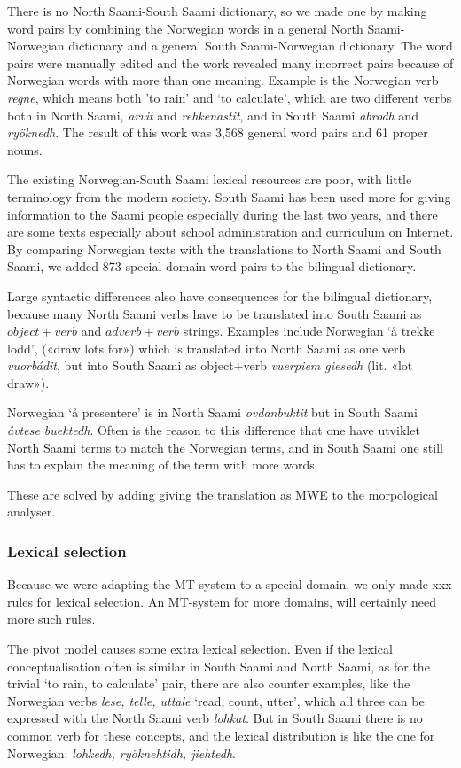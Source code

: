 \documentclass[a4paper,11pt,twocolumn]{article}
\begin{document}
There is no North Saami-South Saami dictionary, so we made one by making word pairs by combining the Norwegian words in a general North Saami-Norwegian dictionary and a general South Saami-Norwegian dictionary. The word pairs were manually edited and the work revealed many incorrect pairs because of Norwegian words with more than one meaning. Example is the Norwegian verb \textit{regne}, which means both 'to rain' and ‘to calculate’, which are two different verbs both in North Saami, \textit{arvit} and \textit{rehkenastit}, and in South Saami \textit{abrodh} and \textit{ryöknedh}. The result of this work was 3,568 general word pairs and 61 proper nouns.

The existing Norwegian-South Saami lexical resources are poor, with little terminology from the modern society. South Saami has been used more for giving information to the Saami people especially during the last two years, and there are some texts especially about school administration and curriculum on Internet. By comparing Norwegian texts with the translations to North Saami and South Saami, we added 873 special domain word pairs to the bilingual dictionary.

Large syntactic differences also have consequences for the bilingual dictionary, because many North Saami verbs have to be translated into South Saami as $object+verb$ and $adverb+verb$ strings. Examples include Norwegian `å trekke lodd', («draw lots for») which is translated into North Saami as one verb \textit{vuorbádit}, but into South Saami as object+verb \textit{vuerpiem giesedh} (lit. «lot draw»).
  
Norwegian `å presentere' is in North Saami \textit{ovdanbuktit} but in South Saami \textit{åvtese buektedh}. Often is the reason to this difference that one have utviklet North Saami terms to match the Norwegian terms, and in South Saami one still has to explain the meaning of the term with more words.

These are solved by adding giving the translation as MWE to the morpological analyser.



\subsubsection{Lexical selection}
Because we were adapting the MT system to a special domain, we only made xxx rules for lexical selection. An MT-system for more domains, will certainly need more such rules. 

The pivot model causes some extra lexical selection. Even if the lexical conceptualisation often is similar in South Saami and North Saami, as for the trivial ‘to rain, to calculate’ pair, there are also counter examples, like the Norwegian verbs \textit{lese, telle, uttale} ‘read, count, utter’, which all three can be expressed with the North Saami verb \textit{lohkat}. But in South Saami there is no common verb for these concepts, and the lexical distribution is like the one for Norwegian: \textit{lohkedh, ryöknehtidh, jiehtedh}. 
\end{document}
